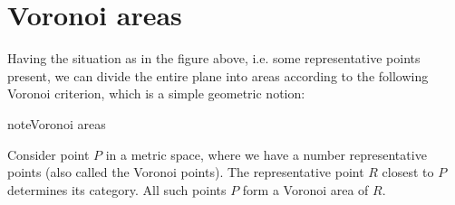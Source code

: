 \documentclass[letterpaper,10pt,english]{jupyterBook}
\begin{document}
\begin{sphinxVerbatim}[commandchars=\\\{\}]
\PYG{p}{[}\PYG{p}{]}\PYG{p}{[}\PYG{p}{]}\PYG{p}{[}\PYG{p}{]}  
\PYG{p}{[}\PYG{p}{]}\PYG{p}{[}\PYG{p}{]}\PYG{p}{[}\PYG{p}{]}  
\PYG{p}{[}\PYG{p}{]}\PYG{p}{[}\PYG{p}{]}\PYG{p}{[}\PYG{p}{]}  
\PYG{p}{[}\PYG{p}{]}\PYG{p}{[}\PYG{p}{]}\PYG{p}{[}\PYG{p}{]}  

\end{sphinxVerbatim}

\noindent{}


\section{Voronoi areas}
\label{\detokenize{docs/unsupervised:voronoi-areas}}\label{\detokenize{docs/unsupervised:vor-lab}}
\sphinxAtStartPar
Having the situation as in the figure above, i.e. some representative points present, we can divide the entire plane into areas according to the following Voronoi criterion, which is a simple geometric notion:

\begin{sphinxadmonition}{note}{Voronoi areas}

\sphinxAtStartPar
Consider point \(P\) in a metric space, where we have a number representative points (also called the Voronoi points). The representative point \(R\) closest to \(P\) determines its category. All such points \(P\) form a Voronoi area of \(R\).
\end{sphinxadmonition}
\end{document}
